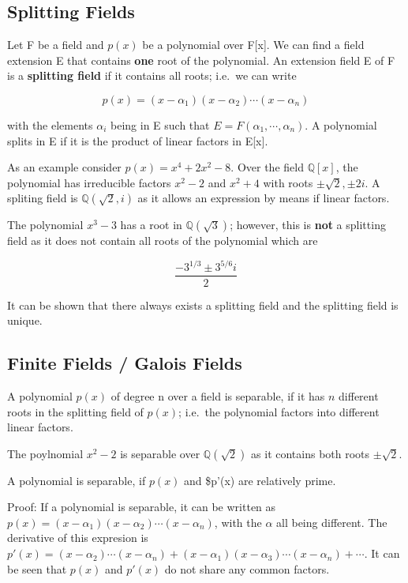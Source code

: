 
\subsection{Splitting Fields}

Let F be a field and \(p(x)\) be a polynomial over F{[}x{]}. We can find
a field extension E that contains \textbf{one} root of the polynomial.
An extension field E of F is a \textbf{splitting field} if it contains
all roots; i.e.~we can write

\[
p(x) = (x - \alpha_1)(x - \alpha_2)\cdots(x - \alpha_n)
\]

with the elements \(\alpha_i\) being in E such that
\(E = F(\alpha_1, \cdots,\alpha_n)\). A polynomial splits in E if it is
the product of linear factors in E{[}x{]}.

As an example consider \(p(x) = x^4 + 2x^2 - 8\). Over the field
\(\mathbb{Q}[x]\), the polynomial has irreducible factors \(x^2-2\) and
\(x^2+4\) with roots \(\pm \sqrt{2}, \pm 2i\). A spliting field is
\(\mathbb{Q}(\sqrt{2},i)\) as it allows an expression by means if linear
factors.

The polynomial \(x^3 - 3\) has a root in \(\mathbb{Q}(\sqrt{3})\);
however, this is \textbf{not} a splitting field as it does not contain
all roots of the polynomial which are

\[
\frac{- 3^{1/3} \pm 3^{5/6}i }{2}
\]

It can be shown that there always exists a splitting field and the
splitting field is unique.

\subsection{Finite Fields / Galois Fields}

A polynomial \(p(x)\) of degree n over a field is separable, if it has
\(n\) different roots in the splitting field of \(p(x)\); i.e.~the
polynomial factors into different linear factors.

The poylnomial \(x^2 - 2\) is separable over \(\mathbb{Q}(\sqrt{2})\) as
it contains both roots \(\pm \sqrt{2}\).

A polynomial is separable, if \(p(x)\) and \$p'(x) are relatively prime.

Proof: If a polynomial is separable, it can be written as
\(p(x) = (x-\alpha_1)(x-\alpha_2)\cdots(x-\alpha_n)\), with the
\(\alpha\) all being different. The derivative of this expresion is
\(p'(x) = (x - \alpha_2)\cdots(x-\alpha_n) + (x-\alpha_1)(x-\alpha_3)\cdots(x-\alpha_n) + \cdots\).
It can be seen that \(p(x)\) and \(p'(x)\) do not share any common
factors.

